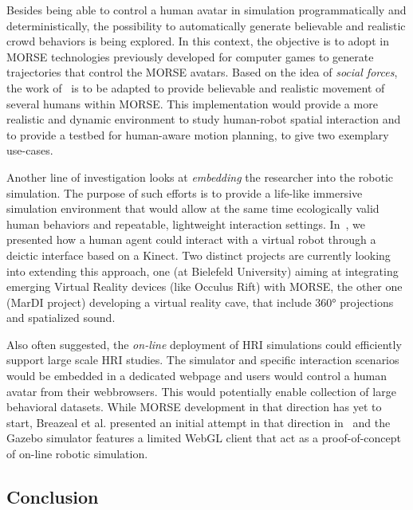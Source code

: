 \documentclass{llncs}
\begin{document}
Besides being able to control a human avatar in simulation programmatically and
deterministically, the possibility to automatically generate believable and
realistic crowd behaviors is being explored. In this context, the objective is
to adopt in MORSE technologies previously developed for computer games to generate
trajectories that control the MORSE avatars. Based on the idea of \emph{social
forces}, the work of~\cite{Szymanezyk2012crowd} is to be
adapted to provide believable and realistic movement of several humans within
MORSE. This
implementation would provide a more realistic and dynamic environment to study
human-robot spatial interaction and to provide a testbed for human-aware motion
planning, to give two exemplary use-cases.

Another line of investigation looks at \emph{embedding} the researcher into the
robotic simulation. The purpose of such efforts is to provide a life-like
immersive simulation environment that would allow at the same time ecologically
valid human behaviors and repeatable, lightweight interaction settings.
In~\cite{lemaignan2012morse}, we presented how a human agent could interact with
a virtual robot through a deictic interface based on a Kinect. Two distinct
projects are currently looking into extending this approach, one (at Bielefeld
University) aiming at integrating emerging Virtual Reality devices (like Occulus
Rift) with MORSE, the other one (MarDI project) developing a virtual reality
cave, that include 360° projections and spatialized sound.

Also often suggested, the \emph{on-line} deployment of HRI simulations could
efficiently support large scale HRI studies. The simulator and specific
interaction scenarios would be embedded in a dedicated webpage and users would
control a human avatar from their webbrowsers. This would potentially enable
collection of large behavioral datasets. While MORSE development in that
direction has yet to start, Breazeal et al. presented an initial attempt in that
direction in~\cite{breazeal2013crowdsourcing} and the Gazebo simulator features
a limited WebGL client that act as a proof-of-concept of on-line robotic
simulation.


\subsection*{Conclusion}
\end{document}
